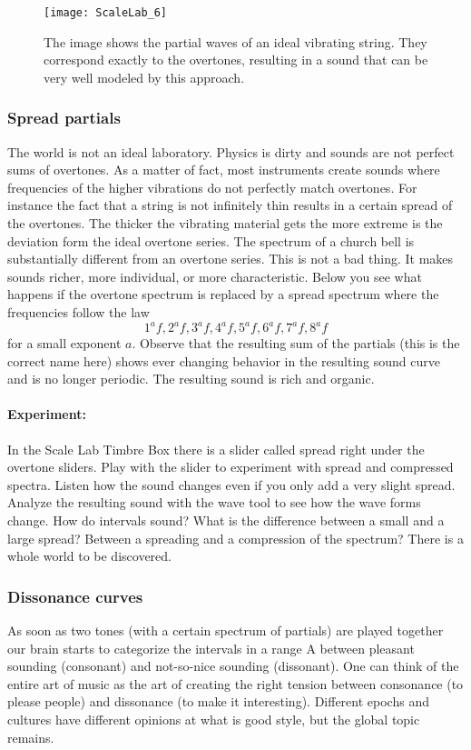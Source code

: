 \begin{figure}
\centering
\texttt{[image: ScaleLab\_6]}
\caption*{The image shows the partial waves of an ideal vibrating string. They correspond exactly to the overtones, resulting in a sound that can be very well modeled by this approach.}
\end{figure}


\subsubsection{Spread partials}
The world is not an ideal laboratory. Physics is dirty and sounds are not perfect sums of overtones. As a matter of fact, most instruments create sounds where frequencies of the higher vibrations do not perfectly match overtones. For instance the fact that a string is not infinitely thin results in a certain spread of the overtones. The thicker the vibrating material gets the more extreme is the deviation form the ideal overtone series. The spectrum of a church bell is substantially different from an overtone series. This is not a bad thing. It makes sounds richer, more individual, or more characteristic. Below you see what happens if the overtone spectrum is replaced by a spread spectrum where the frequencies follow the law 
$$1^af, 2^af, 3^af, 4^af, 5^af, 6^af, 7^af, 8^af$$
for a small exponent $a$. Observe that the resulting sum of the partials (this is the correct name here) shows ever changing behavior in the resulting sound curve and is no longer periodic. The resulting sound is rich and organic. 

\paragraph{Experiment:} 
In the  Scale Lab Timbre Box there is a slider called spread right under the overtone sliders. Play with the slider to experiment with spread and compressed spectra. Listen how the sound changes even if you only add a very slight spread. Analyze the resulting sound with the wave tool to see how the wave forms change. How do intervals sound? What is the difference between a small and a large spread? Between a spreading and a compression of the spectrum? There is a whole world to be discovered.


\subsubsection{Dissonance curves}
As soon as two tones (with a certain spectrum of partials) are played together our brain starts to categorize the intervals in a range
A between pleasant sounding (consonant) and not-so-nice sounding (dissonant). One can think of the entire art of music as the art of creating the right tension between consonance (to please people) and dissonance (to make it interesting). Different epochs and cultures have different opinions at what is good style, but the global topic remains.

